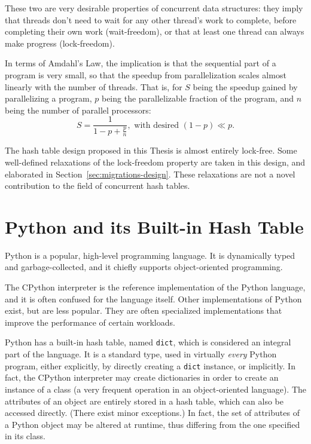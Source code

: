 These two are very desirable properties of concurrent data structures: they imply that threads don't need to wait for any other thread's work to complete, before completing their own work (wait-freedom), or that at least one thread can always make progress (lock-freedom).

In terms of Amdahl's Law, the implication is that the sequential part of a program is very small, so that the speedup from parallelization scales almost linearly with the number of threads.
That is, for $S$ being the speedup gained by parallelizing a program, $p$ being the parallelizable fraction of the program, and $n$ being the number of parallel processors:
\[
    S = \frac{1}{1 - p + \frac{p}{n}}, \text{~with~desired~} (1 - p) \ll p.
\]

The hash table design proposed in this Thesis is almost entirely lock-free.
Some well-defined relaxations of the lock-freedom property are taken in this design, and elaborated in Section~\ref{sec:migrations-design}.
These relaxations are not a novel contribution to the field of concurrent hash tables.


\section{Python and its Built-in Hash Table}\label{sec:dict-intro}

Python is a popular, high-level programming language.
It is dynamically typed and garbage-collected, and it chiefly supports object-oriented programming.

The CPython interpreter is the reference implementation of the Python language, and it is often confused for the language itself.
Other implementations of Python exist, but are less popular.
They are often specialized implementations that improve the performance of certain workloads.

Python has a built-in hash table, named \texttt{dict}, which is considered an integral part of the language.
It is a standard type, used in virtually \emph{every} Python program, either explicitly, by directly creating a \texttt{dict} instance, or implicitly.
In fact, the CPython interpreter may create dictionaries in order to create an instance of a class (a very frequent operation in an object-oriented language).
The attributes of an object are entirely stored in a hash table, which can also be accessed directly.
(There exist minor exceptions.)
In fact, the set of attributes of a Python object may be altered at runtime, thus differing from the one specified in its class.


